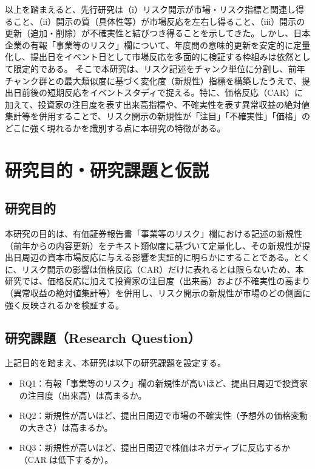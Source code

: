 以上を踏まえると、先行研究は（i）リスク開示が市場・リスク指標と関連し得ること、（ii）開示の質（具体性等）が市場反応を左右し得ること、（iii）開示の更新（追加・削除）が不確実性と結びつき得ることを示してきた。しかし、日本企業の有報「事業等のリスク」欄について、年度間の意味的更新を安定的に定量化し、提出日をイベント日として市場反応を多面的に検証する枠組みは依然として限定的である。
そこで本研究は、リスク記述をチャンク単位に分割し、前年チャンク群との最大類似度に基づく変化度（新規性）指標を構築したうえで、提出日前後の短期反応をイベントスタディで捉える。特に、価格反応（CAR）に加えて、投資家の注目度を表す出来高指標や、不確実性を表す異常収益の絶対値集計等を併用することで、リスク開示の新規性が「注目」「不確実性」「価格」のどこに強く現れるかを識別する点に本研究の特徴がある。

\section{研究目的・研究課題と仮説}

\subsection{研究目的}

本研究の目的は、有価証券報告書「事業等のリスク」欄における記述の新規性（前年からの内容更新）をテキスト類似度に基づいて定量化し、その新規性が提出日周辺の資本市場反応に与える影響を実証的に明らかにすることである。とくに、リスク開示の影響は価格反応（CAR）だけに表れるとは限らないため、本研究では、価格反応に加えて投資家の注目度（出来高）および不確実性の高まり（異常収益の絶対値集計等）を併用し、リスク開示の新規性が市場のどの側面に強く反映されるかを検証する。

\subsection{研究課題（Research Question）}

上記目的を踏まえ、本研究は以下の研究課題を設定する。

\begin{itemize}
  \item RQ1：有報「事業等のリスク」欄の新規性が高いほど、提出日周辺で投資家の注目度（出来高）は高まるか。
  \item RQ2：新規性が高いほど、提出日周辺で市場の不確実性（予想外の価格変動の大きさ）は高まるか。
  \item RQ3：新規性が高いほど、提出日周辺で株価はネガティブに反応するか（CAR は低下するか）。
\end{itemize}

